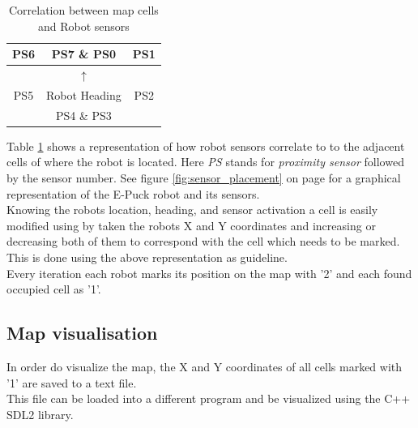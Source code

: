 \begin{table}[h]
\begin{center}
\begin{tabular}{c | c | c}
PS6 & PS7 \& PS0 & PS1 \\\hline
 & $\uparrow$ & \\
PS5 & Robot Heading & PS2 \\\hline
 & PS4 \& PS3 & 
\end{tabular}
\caption{Correlation between map cells and Robot sensors}
\label{tab:cells}
\end{center}
\end{table}

Table \ref{tab:cells} shows a representation of how robot sensors correlate to to the adjacent cells of where the robot is located. Here \textit{PS} stands for \textit{proximity sensor} followed by the sensor number. See figure \ref{fig:sensor_placement} on page \pageref{fig:sensor_placement} for a graphical representation of the E-Puck robot and its sensors.  \\
Knowing the robots location, heading, and sensor activation a cell is easily modified using by taken the robots X and Y coordinates and increasing or decreasing both of them to correspond with the cell which needs to be marked. This is done using the above representation as guideline. \\
Every iteration each robot marks its position on the map with '2' and each found occupied cell as '1'.\\

\subsection{Map visualisation}
In order do visualize the map, the X and Y coordinates of all cells marked with '1' are saved to a text file.\\
This file can be loaded into a different program and be visualized using the C++ SDL2 library.
